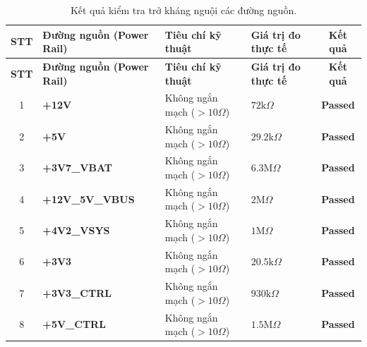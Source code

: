             \begin{longtable}{|c|p{}|p{}|p{}|c|}
                \caption{Kết quả kiểm tra trở kháng nguội các đường nguồn.}
                \label{tab:cold_check_results} \\
                \hline
                \textbf{STT} & \textbf{Đường nguồn (Power Rail)} & \textbf{Tiêu chí kỹ thuật} & \textbf{Giá trị đo thực tế} & \textbf{Kết quả} \\ \hline
                \endfirsthead
                \hline
                \textbf{STT} & \textbf{Đường nguồn (Power Rail)} & \textbf{Tiêu chí kỹ thuật} & \textbf{Giá trị đo thực tế} & \textbf{Kết quả} \\ \hline
                \endhead
                \hline
                \endfoot
                \endlastfoot

                1 & \textbf{+12V} & Không ngắn mạch ($> 10\Omega$) & $72\text{k}\Omega$ & \textcolor{modern_blue}{\textbf{Passed}} \\ \hline

                2 & \textbf{+5V} & Không ngắn mạch ($> 10\Omega$) & $29.2\text{k}\Omega$ & \textcolor{modern_blue}{\textbf{Passed}} \\ \hline
                
                3 & \textbf{+3V7\_VBAT} & Không ngắn mạch ($> 10\Omega$) & $6.3\text{M}\Omega$ & \textcolor{modern_blue}{\textbf{Passed}} \\ \hline
                
                4 & \textbf{+12V\_5V\_VBUS} & Không ngắn mạch ($> 10\Omega$) & $2\text{M}\Omega$ & \textcolor{modern_blue}{\textbf{Passed}} \\ \hline
                
                5 & \textbf{+4V2\_VSYS} & Không ngắn mạch ($> 10\Omega$) & $1\text{M}\Omega$ & \textcolor{modern_blue}{\textbf{Passed}} \\ \hline
                
                6 & \textbf{+3V3} & Không ngắn mạch ($> 10\Omega$) & $20.5\text{k}\Omega$ & \textcolor{modern_blue}{\textbf{Passed}} \\ \hline
                
                7 & \textbf{+3V3\_CTRL} & Không ngắn mạch ($> 10\Omega$) & $930\text{k}\Omega$ & \textcolor{modern_blue}{\textbf{Passed}} \\ \hline
                
                8 & \textbf{+5V\_CTRL} & Không ngắn mạch ($> 10\Omega$) & $1.5\text{M}\Omega$ & \textcolor{modern_blue}{\textbf{Passed}} \\ \hline
            \end{longtable}

